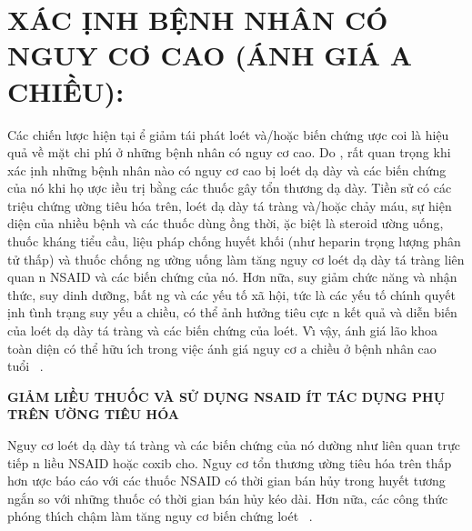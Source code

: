 \documentclass[9pt,twocolumn]{article}
\begin{document}
    
\section*
  {\textbf{X\'{A}C \text{\DJ}\d{I}NH BỆNH NH\^{A}N C{\'O} NGUY CƠ CAO (\text{\DJ}\'{A}NH GI\'{A} \text{\DJ}A CHIỀU):}}
C\'{a}c chi{{\'{\^{e}}}}n lược hi{\^{\d{e}}}n t{\d{a}}i \text{\dj}ể giảm t\'{a}i ph\'{a}t lo{\'e}t v\`{a}/hoặc bi{{\'{\^{e}}}}n chứng \text{\dj}ược coi l\`{a} hi{\^{\d{e}}}u quả về mặt chi ph\'{\i} ở những b{\^{\d{e}}}nh nh\^{a}n c{\'{o}} nguy cơ cao. Do , rất quan tr\d{o}ng khi x\'{a}c \text{\dj}\d{i}nh những b{\^{\d{e}}}nh nh\^{a}n n\`{a}o c{\'{o}} nguy cơ cao b\d{i} lo{\'e}t d{\d{a}} d\`{a}y v\`{a} c\'{a}c bi{{\'{\^{e}}}}n chứng của n{\'{o}} khi h\d{o} \text{\dj}ược \text{\dj}iều tr\d{i} bằng c\'{a}c thuốc g\^{a}y tổn thương d{\d{a}} d\`{a}y. Tiền sử c{\'{o}} c\'{a}c tri{\^{\d{e}}}u chứng \text{\dj}ường ti{\^{e}}u h{\'{o}}a tr{\^{e}}n, lo{\'e}t d{\d{a}} d\`{a}y t\'{a} tr\`{a}ng v\`{a}/hoặc chảy m\'{a}u, sự hi{\^{\d{e}}}n di{\^{\d{e}}}n của nhiều b{\^{\d{e}}}nh v\`{a} c\'{a}c thuốc d\`{u}ng \text{\dj}ồng thời, \text{\dj}ặc bi{\^{\d{e}}}t l\`{a} steroid \text{\dj}ường uống, thuốc kh\'{a}ng tiểu cầu, li{\^{\d{e}}}u ph\'{a}p chống huy{{\'{\^{e}}}}t khối (như heparin tr\d{o}ng lượng ph\^{a}n tử thấp) v\`{a} thuốc chống ng \text{\dj}ường uống l\`{a}m t{\u{a}}ng nguy cơ lo{\'e}t d{\d{a}} d\`{a}y t\'{a} tr\`{a}ng li{\^{e}}n quan n NSAID v\`{a} c\'{a}c bi{{\'{\^{e}}}}n chứng của n{\'{o}}. Hơn nữa, suy giảm chức n{\u{a}}ng v\`{a} nh{\^{\d{a}}}n thức, suy dinh dưỡng, bất ng v\`{a} c\'{a}c y{{\'{\^{e}}}}u tố x{\~{a}} h{\^{\d{o}}}i, tức l\`{a} c\'{a}c y{{\'{\^{e}}}}u tố ch\'{\i}nh quy{{\'{\^{e}}}}t \text{\dj}\d{i}nh t\`{\i}nh tr{\d{a}}ng suy y{{\'{\^{e}}}}u \text{\dj}a chiều, c{\'{o}} thể ảnh hưởng ti{\^{e}}u cực n k{{\'{\^{e}}}}t quả v\`{a} di{\~{\^e}}n bi{{\'{\^{e}}}}n của lo{\'e}t d{\d{a}} d\`{a}y t\'{a} tr\`{a}ng v\`{a} c\'{a}c bi{{\'{\^{e}}}}n chứng của lo{\'e}t. V\`{\i} v{\^{\d{a}}}y, \text{\dj}\'{a}nh gi\'{a} l{\~{a}}o khoa to\`{a}n di{\^{\d{e}}}n c{\'{o}} thể hữu \'{\i}ch trong vi{\^{\d{e}}}c \text{\dj}\'{a}nh gi\'{a} nguy cơ \text{\dj}a chiều ở b{\^{\d{e}}}nh nh\^{a}n cao tuổi\unskip~\cite{2901310:34531806} .

\textbf{GIẢM LIỀU THUỐC V\`{A} SỬ D\d{U}NG NSAID \'{I}T T\'{A}C D\d{U}NG PH\d{U} TR\^{E}N \text{\DJ}ƯỜNG TI\^{E}U H{\'O}A} \textbf{\space }

Nguy cơ lo{\'e}t d{\d{a}} d\`{a}y t\'{a} tr\`{a}ng v\`{a} c\'{a}c bi{{\'{\^{e}}}}n chứng của n{\'{o}} dường như li{\^{e}}n quan trực ti{{\'{\^{e}}}}p n liều NSAID hoặc coxib  cho. Nguy cơ tổn thương \text{\dj}ường ti{\^{e}}u h{\'{o}}a tr{\^{e}}n thấp hơn  \text{\dj}ược b\'{a}o c\'{a}o với c\'{a}c thuốc NSAID c{\'{o}} thời gian b\'{a}n hủy trong huy{{\'{\^{e}}}}t tương ngắn so với những thuốc c{\'{o}} thời gian b\'{a}n hủy k{\'e}o d\`{a}i. Hơn nữa, c\'{a}c c{\^o}ng thức ph{\'{o}}ng th\'{\i}ch ch{\^{\d{a}}}m l\`{a}m t{\u{a}}ng nguy cơ bi{{\'{\^{e}}}}n chứng lo{\'e}t\unskip~\cite{2901310:34531806,2901310:34531817} .
\end{document}
